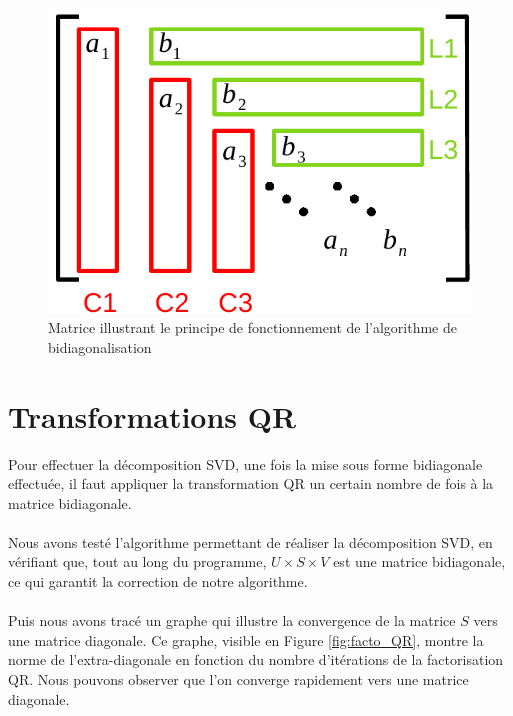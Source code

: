 \documentclass{article}
\begin{document}
\begin{figure}[H]
    \centering
    \includegraphics[scale=0.5]{matrice_exemple.pdf}
    \caption{Matrice illustrant le principe de fonctionnement de l'algorithme de bidiagonalisation}
    \label{fig:matrice_ex}
\end{figure}

\section{Transformations QR}

Pour effectuer la décomposition SVD, une fois la mise sous forme bidiagonale effectuée, il faut appliquer la transformation QR un certain nombre de fois à la matrice bidiagonale.

\paragraph{}
Nous avons testé l'algorithme permettant de réaliser la décomposition SVD, en vérifiant que, tout au long du programme, $U \times S \times V$ est une matrice bidiagonale, ce qui garantit la correction de notre algorithme. 

\paragraph{}
Puis nous avons tracé un graphe qui illustre la convergence de la matrice $S$ vers une matrice diagonale. Ce graphe, visible en Figure \ref{fig:facto_QR}, montre la norme de l'extra-diagonale en fonction du nombre d'itérations de la factorisation QR. Nous pouvons observer que l'on converge rapidement vers une matrice diagonale.
\end{document}
